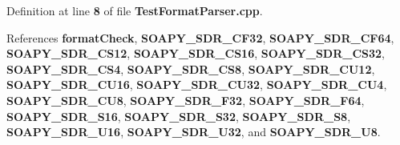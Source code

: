 Definition at line {\bf 8} of file {\bf Test\+Format\+Parser.\+cpp}.



References {\bf format\+Check}, {\bf S\+O\+A\+P\+Y\+\_\+\+S\+D\+R\+\_\+\+C\+F32}, {\bf S\+O\+A\+P\+Y\+\_\+\+S\+D\+R\+\_\+\+C\+F64}, {\bf S\+O\+A\+P\+Y\+\_\+\+S\+D\+R\+\_\+\+C\+S12}, {\bf S\+O\+A\+P\+Y\+\_\+\+S\+D\+R\+\_\+\+C\+S16}, {\bf S\+O\+A\+P\+Y\+\_\+\+S\+D\+R\+\_\+\+C\+S32}, {\bf S\+O\+A\+P\+Y\+\_\+\+S\+D\+R\+\_\+\+C\+S4}, {\bf S\+O\+A\+P\+Y\+\_\+\+S\+D\+R\+\_\+\+C\+S8}, {\bf S\+O\+A\+P\+Y\+\_\+\+S\+D\+R\+\_\+\+C\+U12}, {\bf S\+O\+A\+P\+Y\+\_\+\+S\+D\+R\+\_\+\+C\+U16}, {\bf S\+O\+A\+P\+Y\+\_\+\+S\+D\+R\+\_\+\+C\+U32}, {\bf S\+O\+A\+P\+Y\+\_\+\+S\+D\+R\+\_\+\+C\+U4}, {\bf S\+O\+A\+P\+Y\+\_\+\+S\+D\+R\+\_\+\+C\+U8}, {\bf S\+O\+A\+P\+Y\+\_\+\+S\+D\+R\+\_\+\+F32}, {\bf S\+O\+A\+P\+Y\+\_\+\+S\+D\+R\+\_\+\+F64}, {\bf S\+O\+A\+P\+Y\+\_\+\+S\+D\+R\+\_\+\+S16}, {\bf S\+O\+A\+P\+Y\+\_\+\+S\+D\+R\+\_\+\+S32}, {\bf S\+O\+A\+P\+Y\+\_\+\+S\+D\+R\+\_\+\+S8}, {\bf S\+O\+A\+P\+Y\+\_\+\+S\+D\+R\+\_\+\+U16}, {\bf S\+O\+A\+P\+Y\+\_\+\+S\+D\+R\+\_\+\+U32}, and {\bf S\+O\+A\+P\+Y\+\_\+\+S\+D\+R\+\_\+\+U8}.

